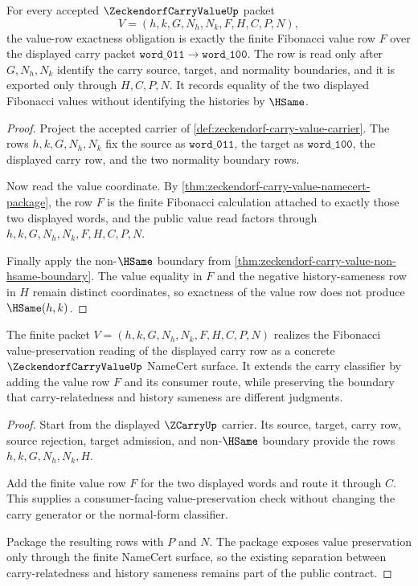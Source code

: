 \begin{theorem}
\label{thm:zeckendorf-carry-value-obligation-value-row-exactness}
For every accepted $\ZeckendorfCarryValueUp$ packet
$$
V=(h,k,G,N_h,N_k,F,H,C,P,N),
$$
the value-row exactness obligation is exactly the finite Fibonacci value row $F$ over the displayed carry packet $\mathtt{word\_011}\to\mathtt{word\_100}$. The row is read only after $G,N_h,N_k$ identify the carry source, target, and normality boundaries, and it is exported only through $H,C,P,N$. It records equality of the two displayed Fibonacci values without identifying the histories by $\HSame$.
\end{theorem}
\begin{proof}
Project the accepted carrier of \autoref{def:zeckendorf-carry-value-carrier}. The rows $h,k,G,N_h,N_k$ fix the source as $\mathtt{word\_011}$, the target as $\mathtt{word\_100}$, the displayed carry row, and the two normality boundary rows.

Now read the value coordinate. By \autoref{thm:zeckendorf-carry-value-namecert-package}, the row $F$ is the finite Fibonacci calculation attached to exactly those two displayed words, and the public value read factors through $h,k,G,N_h,N_k,F,H,C,P,N$.

Finally apply the non-$\HSame$ boundary from \autoref{thm:zeckendorf-carry-value-non-hsame-boundary}. The value equality in $F$ and the negative history-sameness row in $H$ remain distinct coordinates, so exactness of the value row does not produce $\HSame(h,k)$.
\end{proof}

\begin{theorem}
\label{thm:zeckendorf-carry-value-vision-realization}
The finite packet $V=(h,k,G,N_h,N_k,F,H,C,P,N)$ realizes the Fibonacci value-preservation reading of the displayed carry row as a concrete $\ZeckendorfCarryValueUp$ NameCert surface. It extends the carry classifier by adding the value row $F$ and its consumer route, while preserving the boundary that carry-relatedness and history sameness are different judgments.
\end{theorem}
\begin{proof}
Start from the displayed $\ZCarryUp$ carrier. Its source, target, carry row, source rejection, target admission, and non-$\HSame$ boundary provide the rows $h,k,G,N_h,N_k,H$.

Add the finite value row $F$ for the two displayed words and route it through $C$. This supplies a consumer-facing value-preservation check without changing the carry generator or the normal-form classifier.

Package the resulting rows with $P$ and $N$. The package exposes value preservation only through the finite NameCert surface, so the existing separation between carry-relatedness and history sameness remains part of the public contract.
\end{proof}

